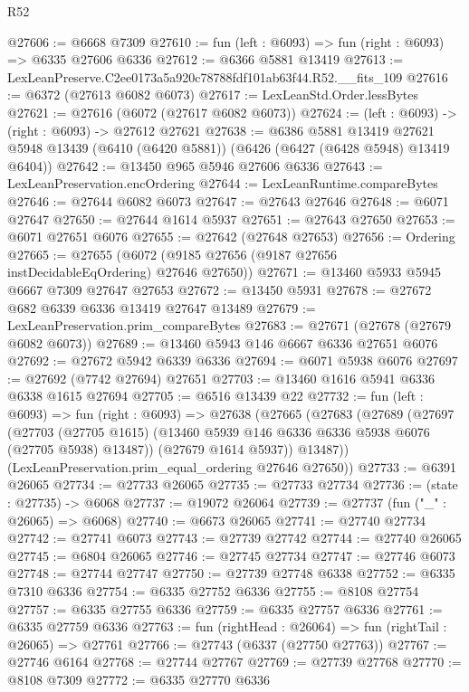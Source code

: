 \begin{lexlean}{R52}
\begin{coremodule}
@27606 := @6668 @7309
@27610 := fun (left : @6093) => fun (right : @6093) => @6335 @27606 @6336
@27612 := @6366 @5881 @13419
@27613 := LexLeanPreserve.C2ee0173a5a920c78788fdf101ab63f44.R52.__fits_109
@27616 := @6372 (@27613 @6082 @6073)
@27617 := LexLeanStd.Order.lessBytes
@27621 := @27616 (@6072 (@27617 @6082 @6073))
@27624 := (left : @6093) -> (right : @6093) -> @27612 @27621
@27638 := @6386
    @5881
    @13419
    @27621
    @5948
    @13439
    (@6410 (@6420 @5881))
    (@6426 (@6427 (@6428 @5948) @13419 @6404))
@27642 := @13450 @965 @5946 @27606 @6336
@27643 := LexLeanPreservation.encOrdering
@27644 := LexLeanRuntime.compareBytes
@27646 := @27644 @6082 @6073
@27647 := @27643 @27646
@27648 := @6071 @27647
@27650 := @27644 @1614 @5937
@27651 := @27643 @27650
@27653 := @6071 @27651 @6076
@27655 := @27642 (@27648 @27653)
@27656 := Ordering
@27665 := @27655 (@6072 (@9185 @27656 (@9187 @27656 instDecidableEqOrdering) @27646 @27650))
@27671 := @13460 @5933 @5945 @6667 @7309 @27647 @27653
@27672 := @13450 @5931
@27678 := @27672 @682 @6339 @6336 @13419 @27647 @13489
@27679 := LexLeanPreservation.prim_compareBytes
@27683 := @27671 (@27678 (@27679 @6082 @6073))
@27689 := @13460 @5943 @146 @6667 @6336 @27651 @6076
@27692 := @27672 @5942 @6339 @6336
@27694 := @6071 @5938 @6076
@27697 := @27692 (@7742 @27694) @27651
@27703 := @13460 @1616 @5941 @6336 @6338 @1615 @27694
@27705 := @6516 @13439 @22
@27732 := fun (left : @6093) =>
  fun (right : @6093) =>
  @27638
    (@27665
      (@27683
        (@27689
          (@27697
            (@27703
              (@27705 @1615)
              (@13460 @5939 @146 @6336 @6336 @5938 @6076 (@27705 @5938) @13487))
            (@27679 @1614 @5937))
          @13487))
      (LexLeanPreservation.prim_equal_ordering @27646 @27650))
@27733 := @6391 @26065
@27734 := @27733 @26065
@27735 := @27733 @27734
@27736 := (state : @27735) -> @6068
@27737 := @19072 @26064
@27739 := @27737 (fun ("_" : @26065) => @6068)
@27740 := @6673 @26065
@27741 := @27740 @27734
@27742 := @27741 @6073
@27743 := @27739 @27742
@27744 := @27740 @26065
@27745 := @6804 @26065
@27746 := @27745 @27734
@27747 := @27746 @6073
@27748 := @27744 @27747
@27750 := @27739 @27748 @6338
@27752 := @6335 @7310 @6336
@27754 := @6335 @27752 @6336
@27755 := @8108 @27754
@27757 := @6335 @27755 @6336
@27759 := @6335 @27757 @6336
@27761 := @6335 @27759 @6336
@27763 := fun (rightHead : @26064) => fun (rightTail : @26065) => @27761
@27766 := @27743 (@6337 (@27750 @27763))
@27767 := @27746 @6164
@27768 := @27744 @27767
@27769 := @27739 @27768
@27770 := @8108 @7309
@27772 := @6335 @27770 @6336

\end{coremodule}
\end{lexlean}
